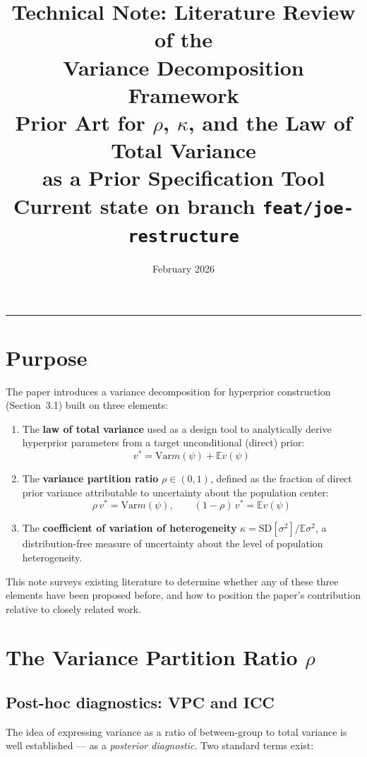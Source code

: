 \documentclass[12pt,a4paper]{article}
\title{Technical Note: Literature Review of the\\Variance Decomposition
Framework\\[6pt]
\large Prior Art for $\rho$, $\kappa$, and the Law of Total Variance\\
as a Prior Specification Tool\\[6pt]
\normalsize Current state on branch \texttt{feat/joe-restructure}}
\author{}
\date{February 2026}
\newcommand{\E}{\mathbb{E}}
\newcommand{\Var}{\mathrm{Var}}
\newcommand{\SD}{\mathrm{SD}}
\begin{document}
\maketitle
\thispagestyle{empty}

\vspace{1em}
\hrule
\vspace{1em}

\section{Purpose}

The paper introduces a variance decomposition for hyperprior construction
(Section~3.1) built on three elements:

\begin{enumerate}[label=(\roman*)]
  \item The \textbf{law of total variance} used as a design tool to
    analytically derive hyperprior parameters from a target unconditional
    (direct) prior:
    \[
      v^* = \Var{m(\psi)} + \E{v(\psi)}
    \]
  \item The \textbf{variance partition ratio} $\rho \in (0,1)$, defined as the
    fraction of direct prior variance attributable to uncertainty about the
    population center:
    \[
      \rho\, v^* = \Var{m(\psi)}, \qquad (1-\rho)\, v^* = \E{v(\psi)}
    \]
  \item The \textbf{coefficient of variation of heterogeneity}
    $\kappa = \SD[\sigma^2] / \E{\sigma^2}$, a distribution-free measure of
    uncertainty about the level of population heterogeneity.
\end{enumerate}

This note surveys existing literature to determine whether any of these three
elements have been proposed before, and how to position the paper's
contribution relative to closely related work.


\section{The Variance Partition Ratio $\rho$}

\subsection{Post-hoc diagnostics: VPC and ICC}

The idea of expressing variance as a ratio of between-group to total variance
is well established --- as a \emph{posterior diagnostic}. Two standard terms
exist:
\end{document}
